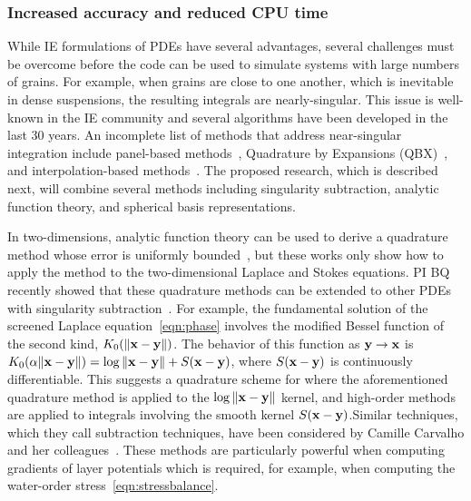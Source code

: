 \subsubsection{Increased accuracy and reduced CPU time}
\label{subsec:NumericalIssues}
While IE formulations of PDEs have several advantages, several
challenges must be overcome before the code can be used to simulate
systems with large numbers of grains. For example, when grains are close
to one another, which is inevitable in dense suspensions, the resulting
integrals are nearly-singular. This issue is well-known in the IE
community and several algorithms have been developed in the last 30
years. An incomplete list of methods that address near-singular
integration include panel-based methods~\cite{helsing_2008a,
helsing_tutorial_2012}, Quadrature by Expansions
(QBX)~\cite{din-hua-mar-tan2021, klo-bar-gre-one2013, ste-bar2022,
af2018sisc}, and interpolation-based methods~\cite{ying_2006,
qua-bir2014, rah-vee-zor-bir2015}. The proposed research, which is
described next,  will combine several methods including singularity
subtraction, analytic function theory, and spherical basis
representations.

In two-dimensions, analytic function theory can be used to derive a
quadrature method whose error is uniformly bounded~\cite{bar2014,
bar-wu-vee2015, ioa-pap-per1991}, but these works only show how to apply
the method to the two-dimensional Laplace and Stokes equations. PI BQ
recently showed that these quadrature methods can be extended to other
PDEs with singularity subtraction~\cite{che-lin-her-qua2021}. For
example, the fundamental solution of the screened Laplace
equation~\eqref{eqn:phase} involves the modified Bessel function of the
second kind, $K_0(\|\mathbf{x} - \mathbf{y}\|)$. The behavior of this function as $\mathbf{y}
\rightarrow \mathbf{x}$ is $K_0(\alpha \|\mathbf{x} - \mathbf{y}\|) = \log\|\mathbf{x} - \mathbf{y}\| +
S(\mathbf{x} - \mathbf{y})$, where $S(\mathbf{x} - \mathbf{y})$ is continuously differentiable. This
suggests a quadrature scheme for where the aforementioned quadrature
method is applied to the $\log\|\mathbf{x} - \mathbf{y}\|$ kernel, and high-order
methods~\cite{tre-wei2014} are applied to integrals involving the smooth
kernel $S(\mathbf{x} - \mathbf{y})$.Similar techniques, which they call subtraction
techniques, have been considered by Camille Carvalho and her
colleagues~\cite{car2021, car2020, car-kha-kim2018}.  These methods are
particularly powerful when computing gradients of layer potentials which
is required, for example, when computing the water-order
stress~\eqref{eqn:stressbalance}.

